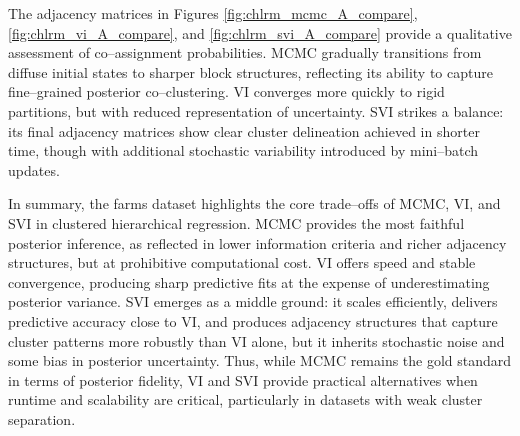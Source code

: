 The adjacency matrices in Figures \ref{fig:chlrm_mcmc_A_compare}, \ref{fig:chlrm_vi_A_compare}, and \ref{fig:chlrm_svi_A_compare} provide a qualitative assessment of co--assignment probabilities. MCMC gradually transitions from diffuse initial states to sharper block structures, reflecting its ability to capture fine--grained posterior co--clustering. VI converges more quickly to rigid partitions, but with reduced representation of uncertainty. SVI strikes a balance: its final adjacency matrices show clear cluster delineation achieved in shorter time, though with additional stochastic variability introduced by mini--batch updates. 

\vspace{0.5cm}

In summary, the farms dataset highlights the core trade--offs of MCMC, VI, and SVI in clustered hierarchical regression. MCMC provides the most faithful posterior inference, as reflected in lower information criteria and richer adjacency structures, but at prohibitive computational cost. VI offers speed and stable convergence, producing sharp predictive fits at the expense of underestimating posterior variance. SVI emerges as a middle ground: it scales efficiently, delivers predictive accuracy close to VI, and produces adjacency structures that capture cluster patterns more robustly than VI alone, but it inherits stochastic noise and some bias in posterior uncertainty. Thus, while MCMC remains the gold standard in terms of posterior fidelity, VI and SVI provide practical alternatives when runtime and scalability are critical, particularly in datasets with weak cluster separation.
